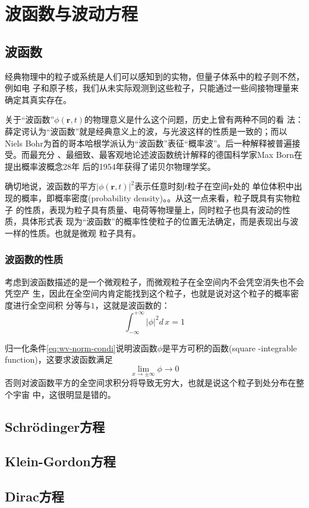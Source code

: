\chapter{波函数与波动方程}

\section{波函数}
经典物理中的粒子或系统是人们可以感知到的实物，但量子体系中的粒子则不然，例如电
子和原子核，我们从未实际观测到这些粒子，只能通过一些间接物理量来确定其真实存在。

关于“波函数”$\phi(\bm{r}, t)$的物理意义是什么这个问题，历史上曾有两种不同的看
法：薛定谔认为“波函数”就是经典意义上的波，与光波这样的性质是一致的；而以Niels 
Bohr为首的哥本哈根学派认为“波函数”表征“概率波”。后一种解释被普遍接受。而最充分
、最细致、最客观地论述波函数统计解释的德国科学家Max Born在提出概率波概念28年
后的1954年获得了诺贝尔物理学奖。

确切地说，波函数的平方$|\phi(\bm{r}, t)|^2$表示任意时刻$t$粒子在空间$\bm{r}$处的
单位体积中出现的概率，即概率密度(probability density)。。从这一点来看，粒子既具有实物粒子
的性质，表现为粒子具有质量、电荷等物理量上，同时粒子也具有波动的性质，具体形式表
现为“波函数”的概率性使粒子的位置无法确定，而是表现出与波一样的性质。也就是微观
粒子具有。

\subsection{波函数的性质}
考虑到波函数描述的是一个微观粒子，而微观粒子在全空间内不会凭空消失也不会凭空产
生，因此在全空间内肯定能找到这个粒子，也就是说对这个粒子的概率密度进行全空间积
分等与$1$，这就是波函数的：
\begin{equation}
    \int_{-\infty}^{+\infty} | \phi | ^2 d\,x = 1
    \label{eq:wv-norm-condi}
\end{equation}

归一化条件\eqref{eq:wv-norm-condi}说明波函数$\phi$是平方可积的函数(square
-integrable function)，这要求波函数满足
\begin{equation}
    \lim_{x \to \pm \infty} \phi \to 0
    \label{eq:wave-}
\end{equation}
否则对波函数平方的全空间求积分将导致无穷大，也就是说这个粒子到处分布在整个宇宙
中，这很明显是错的。

\section{Schr{\"o}dinger方程}
\section{Klein-Gordon方程}
\section{Dirac方程}